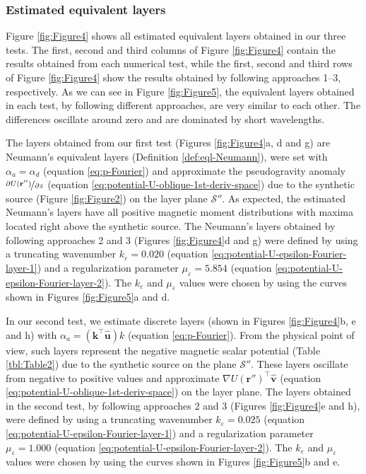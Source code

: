\documentclass[manuscript,noblind]{geophysics}
\begin{document}
	\subsubsection{Estimated equivalent layers}
	
	Figure \ref{fig:Figure4} shows all estimated equivalent layers obtained in our three tests.
	The first, second and third columns of Figure \ref{fig:Figure4} contain the results obtained from 
	each numerical test, while the first, second and third rows of Figure \ref{fig:Figure4} show the 
	results obtained by following approaches 1--3, respectively.
	As we can see in Figure \ref{fig:Figure5}, the equivalent layers obtained in each test, by following 
	different approaches, are very similar to each other.
	The differences oscillate around zero and are dominated by short wavelengths.
	
	The layers obtained from our first test (Figures \ref{fig:Figure4}a, d and g) are Neumann's 
	equivalent layers (Definition \ref{def:eql-Neumann}), 
	were set with $\alpha_{a} = \alpha_{d}$ (equation \ref{eq:p-Fourier}) and approximate the
	pseudogravity anomaly $\nicefrac{\partial U(\mathbf{r}'')}{\partial z}$ 
	(equation \ref{eq:potential-U-oblique-1st-deriv-space}) 
	due to the synthetic source (Figure \ref{fig:Figure2}) on the layer plane $\mathcal{S}''$.
	As expected, the estimated Neumann's layers have all positive magnetic moment distributions 
	with maxima located right above the synthetic source.
	The Neumann's layers obtained by following approaches 2 and 3 
	(Figures \ref{fig:Figure4}d and g) were defined by using a truncating wavenumber 
	$k_{\varepsilon} = 0.020$ (equation \ref{eq:potential-U-epsilon-Fourier-layer-1})
	and a regularization parameter $\mu_{\varepsilon} = 5.854$ 
	(equation \ref{eq:potential-U-epsilon-Fourier-layer-2}). 
	The $k_{\varepsilon}$ and $\mu_{\varepsilon}$ values were chosen by using the curves shown 
	in Figures \ref{fig:Figure5}a and d.
	
	In our second test, we estimate discrete layers (shown in Figures \ref{fig:Figure4}b, e and h) 
	with $\alpha_{a} = \left(\mathbf{k}^{\top} \hat{\mathbf{u}} \right) k$ 
	(equation \ref{eq:p-Fourier}).
	From the physical point of view, such layers represent the negative magnetic scalar 
	potential (Table \ref{tbl:Table2}) due to the synthetic source on the plane $\mathcal{S}''$.
	These layers oscillate from negative to positive values and approximate 
	$\nabla U(\mathbf{r}'')^{\top} \hat{\mathbf{v}}$ 
	(equation \ref{eq:potential-U-oblique-1st-deriv-space}) on the layer plane. 
	The layers obtained in the second test, by following approaches 2 and 3 
	(Figures \ref{fig:Figure4}e and h), were defined by using a truncating wavenumber 
	$k_{\varepsilon} = 0.025$ (equation \ref{eq:potential-U-epsilon-Fourier-layer-1})
	and a regularization parameter $\mu_{\varepsilon} = 1.000$ 
	(equation \ref{eq:potential-U-epsilon-Fourier-layer-2}). 
	The $k_{\varepsilon}$ and $\mu_{\varepsilon}$ values were chosen by using the curves shown 
	in Figures \ref{fig:Figure5}b and e.
	
\end{document}
